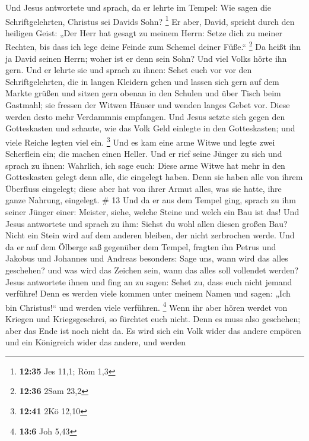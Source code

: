  Und Jesus antwortete und sprach, da er lehrte im Tempel:
Wie sagen die Schriftgelehrten, Christus sei Davids Sohn? \footnote{\textbf{12:35}
  Jes 11,1; Röm 1,3}  Er aber, David, spricht durch den
heiligen Geist: „Der Herr hat gesagt zu meinem Herrn: Setze dich zu
meiner Rechten, bis dass ich lege deine Feinde zum Schemel deiner
Füße.`` \footnote{\textbf{12:36} 2Sam 23,2}  Da heißt ihn
ja David seinen Herrn; woher ist er denn sein Sohn? Und viel Volks hörte
ihn gern.  Und er lehrte sie und sprach zu ihnen: Sehet
euch vor vor den Schriftgelehrten, die in langen Kleidern gehen und
lassen sich gern auf dem Markte grüßen  und sitzen gern
obenan in den Schulen und über Tisch beim Gastmahl;  sie
fressen der Witwen Häuser und wenden langes Gebet vor. Diese werden
desto mehr Verdammnis empfangen.  Und Jesus setzte sich
gegen den Gotteskasten und schaute, wie das Volk Geld einlegte in den
Gotteskasten; und viele Reiche legten viel ein. \footnote{\textbf{12:41}
  2Kö 12,10}  Und es kam eine arme Witwe und legte zwei
Scherflein ein; die machen einen Heller.  Und er rief
seine Jünger zu sich und sprach zu ihnen: Wahrlich, ich sage euch: Diese
arme Witwe hat mehr in den Gotteskasten gelegt denn alle, die eingelegt
haben.  Denn sie haben alle von ihrem Überfluss
eingelegt; diese aber hat von ihrer Armut alles, was sie hatte, ihre
ganze Nahrung, eingelegt. \# 13  Und da er aus dem Tempel
ging, sprach zu ihm seiner Jünger einer: Meister, siehe, welche Steine
und welch ein Bau ist das!  Und Jesus antwortete und
sprach zu ihm: Siehst du wohl allen diesen großen Bau? Nicht ein Stein
wird auf dem anderen bleiben, der nicht zerbrochen werde. 
Und da er auf dem Ölberge saß gegenüber dem Tempel, fragten ihn Petrus
und Jakobus und Johannes und Andreas besonders:  Sage uns,
wann wird das alles geschehen? und was wird das Zeichen sein, wann das
alles soll vollendet werden?  Jesus antwortete ihnen und
fing an zu sagen: Sehet zu, dass euch nicht jemand verführe!
 Denn es werden viele kommen unter meinem Namen und sagen:
„Ich bin Christus!{}`` und werden viele verführen. \footnote{\textbf{13:6}
  Joh 5,43}  Wenn ihr aber hören werdet von Kriegen und
Kriegsgeschrei, so fürchtet euch nicht. Denn es muss also geschehen;
aber das Ende ist noch nicht da.  Es wird sich ein Volk
wider das andere empören und ein Königreich wider das andere, und werden
